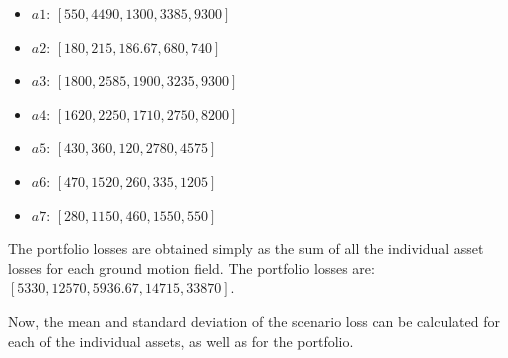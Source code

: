 \begin{itemize}
	\item $a1$: $[550, 4490, 1300, 3385, 9300]$
	\item $a2$: $[180, 215, 186.67, 680, 740]$
	\item $a3$: $[1800, 2585, 1900, 3235, 9300]$
	\item $a4$: $[1620, 2250, 1710, 2750, 8200]$
	\item $a5$: $[430, 360, 120, 2780, 4575]$
	\item $a6$: $[470, 1520, 260, 335, 1205]$
	\item $a7$: $[280, 1150, 460, 1550, 550]$
\end{itemize}

The portfolio losses are obtained simply as the sum of all the individual asset losses for each ground motion field. The portfolio losses are: $[5330, 12570, 5936.67, 14715, 33870]$.

Now, the mean and standard deviation of the scenario loss can be calculated for each of the individual assets, as well as for the portfolio.